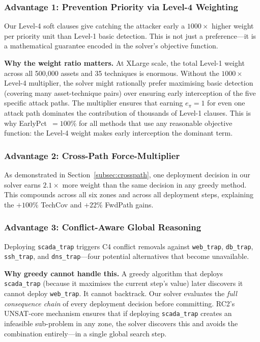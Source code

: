 \documentclass[journal]{IEEEtran}
\begin{document}
\subsubsection{Advantage 1: Prevention Priority via Level-4 Weighting}

Our Level-4 soft clauses give catching the attacker early
a $1000\times$ higher weight per priority unit than Level-1
basic detection.
This is not just a preference---it is a mathematical
guarantee encoded in the solver's objective function.

\begin{examplebox}
\textbf{Why the weight ratio matters.}
At XLarge scale, the total Level-1 weight across all
500,000 assets and 35 techniques is enormous.
Without the $1000\times$ Level-4 multiplier, the solver
might rationally prefer maximising basic detection
(covering many asset-technique pairs) over ensuring early
interception of the five specific attack paths.
The multiplier ensures that earning $e_\pi=1$ for even one
attack path dominates the contribution of thousands of
Level-1 clauses.
This is why EarlyPct~$=100\%$ for all methods that use
any reasonable objective function: the Level-4 weight
makes early interception the dominant term.
\end{examplebox}

\subsubsection{Advantage 2: Cross-Path Force-Multiplier}

As demonstrated in Section~\ref{subsec:crosspath}, one
deployment decision in our solver earns $2.1\times$ more
weight than the same decision in any greedy method.
This compounds across all six zones and across all
deployment steps, explaining the $+100\%$ TechCov and
$+22\%$ FwdPath gains.

\subsubsection{Advantage 3: Conflict-Aware Global Reasoning}

Deploying \texttt{scada\_trap} triggers C4 conflict
removals against \texttt{web\_trap}, \texttt{db\_trap},
\texttt{ssh\_trap}, and \texttt{dns\_trap}---four potential
alternatives that become unavailable.

\begin{insightbox}
\textbf{Why greedy cannot handle this.}
A greedy algorithm that deploys \texttt{scada\_trap}
(because it maximises the current step's value) later
discovers it cannot deploy \texttt{web\_trap}.
It cannot backtrack.
Our solver evaluates the \emph{full consequence chain} of
every deployment decision before committing.
RC2's UNSAT-core mechanism ensures that if deploying
\texttt{scada\_trap} creates an infeasible sub-problem in
any zone, the solver discovers this and avoids the
combination entirely---in a single global search step.
\end{insightbox}
\end{document}
